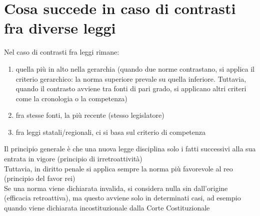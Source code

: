 \documentclass[8pt,oneside,a4paper]{article}
\begin{document}
	\section{Cosa succede in caso di contrasti fra diverse leggi}
	Nel caso di contrasti fra leggi rimane:
	\begin{enumerate}
		\item quella più in alto nella gerarchia (quando due norme contrastano, si applica il criterio gerarchico: la norma superiore prevale su quella inferiore. Tuttavia, quando il contrasto avviene tra fonti di pari grado, si applicano altri criteri come la cronologia o la competenza)
		\item fra stesse fonti, la più recente (stesso legislatore)
		\item fra leggi statali/regionali, ci si basa sul criterio di competenza
	\end{enumerate}
	Il principio generale è che una nuova legge disciplina solo i fatti successivi alla sua entrata in vigore (principio di irretroattività)\\
	Tuttavia, in diritto penale si applica sempre la norma più favorevole al reo (principio del favor rei)\\
	Se una norma viene dichiarata invalida, si considera nulla sin dall'origine (efficacia retroattiva), ma questo avviene solo in determinati casi, ad esempio quando viene dichiarata incostituzionale dalla Corte Costituzionale
\end{document}
